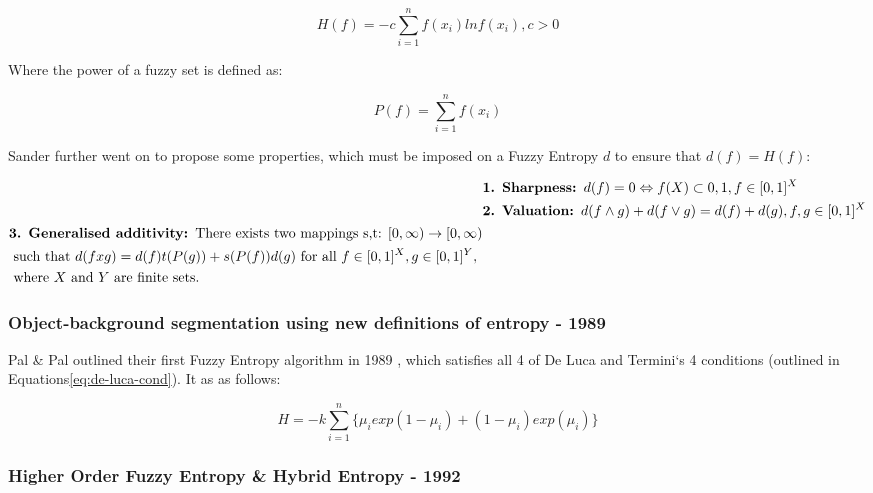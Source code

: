 \begin{equation}\label{eq:fuzzy-shannon}
  H(f) = -c \displaystyle\sum_{i=1}^{n}{f(x_i)lnf(x_i), c > 0}
\end{equation}

Where the power of a fuzzy set is defined as:

\begin{equation}
  P(f) = \displaystyle\sum_{i=1}^{n}{f (x_i)}
\end{equation}

Sander further went on to propose some properties, which must be imposed on a Fuzzy Entropy $d$ to ensure that $d(f) = H(f)$:

\begin{subequations}
  \begin{align}
    &\text{\textbf{1. Sharpness: }} d(f) = 0 \Leftrightarrow f(X) \subset {0,1}, f \in [0,1]^X \\
    &\text{\textbf{2. Valuation: }} d(f \wedge g) + d(f \vee g) = d(f) + d(g), f,g \in [0,1]^X \\
    \begin{split}
    &\text{\textbf{3. Generalised additivity: }} \text{There exists two mappings s,t: } [0,\infty) \rightarrow  [0,\infty) \\
      &\text{ such that } d(f x g) = d(f)t(P(g)) + s(P(f))d(g) \text{ for all } f \in [0,1]^X, g \in [0,1]^Y, \\
      &\text{ where } X \text{ and } Y \text{ are finite sets.}
    \end{split}
  \end{align}
\end{subequations}

\subsubsection{Object-background segmentation using new definitions of entropy - 1989}

Pal \& Pal outlined their first Fuzzy Entropy algorithm in 1989 \cite{Pal_Pal_1989}, which satisfies all 4 of De Luca and Termini`s 4 conditions (outlined in Equations\eqref{eq:de-luca-cond}). It as as follows:

\begin{equation} \label{eq:pal-pal-orig}
  H = -k  \displaystyle\sum_{i=1}^{n}{\{\mu_iexp(1 - \mu_i) + (1 - \mu_i)exp(\mu_i)\}}
\end{equation}

\subsubsection{Higher Order Fuzzy Entropy \& Hybrid Entropy - 1992}
\label{sssec:hybrid-section}

